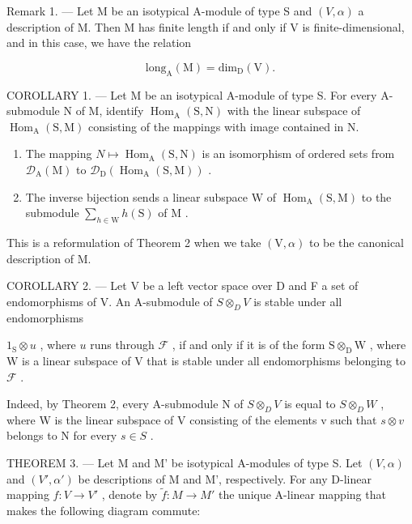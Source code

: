 Remark 1. --- Let M be an isotypical A-module of type S and \((V, \alpha)\) a description of M. Then M has finite length if and only if V is finite-dimensional, and in this case, we have the relation

\[
\mathrm{long} _ {\mathrm{A}} (\mathrm{M}) = \mathrm{dim} _ {\mathrm{D}} (\mathrm{V}).
\]

COROLLARY 1. --- Let M be an isotypical A-module of type S. For every A-submodule N of M, identify \(\operatorname{Hom}_{\mathrm{A}}(\mathrm{S},\mathrm{N})\) with the linear subspace of \(\operatorname{Hom}_{\mathrm{A}}(\mathrm{S},\mathrm{M})\) consisting of the mappings with image contained in N.

\begin{enumerate}
\def\labelenumi{\alph{enumi})}
\item
  The mapping \(N \mapsto \operatorname{Hom}_{\mathrm{A}}(\mathrm{S}, \mathrm{N})\) is an isomorphism of ordered sets from \(\mathcal{D}_{\mathrm{A}}(\mathrm{M})\) to \(\mathcal{D}_{\mathrm{D}}(\operatorname{Hom}_{\mathrm{A}}(\mathrm{S}, \mathrm{M}))\) .
\item
  The inverse bijection sends a linear subspace \(\mathrm{W}\) of \(\operatorname{Hom}_{\mathrm{A}}(\mathrm{S}, \mathrm{M})\) to the submodule \(\sum_{h \in \mathrm{W}} h(\mathrm{S})\) of \(\mathrm{M}\) .
\end{enumerate}

This is a reformulation of Theorem 2 when we take \((\mathrm{V},\alpha)\) to be the canonical description of M.

COROLLARY 2. --- Let V be a left vector space over D and F a set of endomorphisms of V. An A-submodule of \(S \otimes_{D} V\) is stable under all endomorphisms

\(1_{\mathrm{S}} \otimes u\) , where \(u\) runs through \(\mathcal{F}\) , if and only if it is of the form \(\mathrm{S} \otimes_{\mathrm{D}} \mathrm{W}\) , where \(\mathrm{W}\) is a linear subspace of \(\mathrm{V}\) that is stable under all endomorphisms belonging to \(\mathcal{F}\) .

Indeed, by Theorem 2, every A-submodule N of \(S \otimes_{D} V\) is equal to \(S \otimes_{D} W\) , where W is the linear subspace of V consisting of the elements v such that \(s \otimes v\) belongs to N for every \(s \in S\) .

THEOREM 3. --- Let M and M' be isotypical A-modules of type S. Let \((V, \alpha)\) and \((V', \alpha')\) be descriptions of M and M', respectively. For any D-linear mapping \(f : V \to V'\) , denote by \(\widetilde{f} : M \to M'\) the unique A-linear mapping that makes the following diagram commute:

